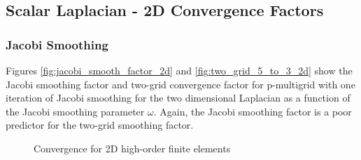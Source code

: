 \documentclass[review]{siamart190516}
\begin{document}
\subsection{Scalar Laplacian - 2D Convergence Factors}\label{sec:2dresults}

\subsubsection{Jacobi Smoothing}

Figures \ref{fig:jacobi_smooth_factor_2d} and \ref{fig:two_grid_5_to_3_2d} show the Jacobi smoothing factor and two-grid convergence factor for p-multigrid with one iteration of Jacobi smoothing for the two dimensional Laplacian as a function of the Jacobi smoothing parameter $\omega$.
Again, the Jacobi smoothing factor is a poor predictor for the two-grid smoothing factor.

\begin{figure}[!tbp]
  \centering
  \hfill
  \caption{Convergence for 2D high-order finite elements}
\end{figure}
\end{document}
